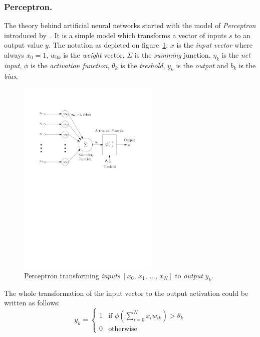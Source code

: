 \subsubsection{Perceptron.}
\label{sec:models-perceptron}

The theory behind artificial neural networks started with the model of \emph{Perceptron} introduced by~\citet{mcculloch1943logical}. It is a simple model which transforms a vector of inputs $s$ to an output value $y$. The notation as depicted on figure~\ref{fig:perceptron}: $x$ is the \emph{input vector} where always $x_0=1$, $w_{0k}$ is the \emph{weight} vector, $\Sigma$ is the \emph{summing} junction, $\eta_k$ is the \emph{net input}, $\phi$ is the \emph{activation function}, $\theta_k$ is the \emph{treshold}, $y_k$ is the \emph{output} and $b_k$ is the \emph{bias}.

\begin{figure}[H]
  \centering
  \includegraphics[width=0.6\textwidth]{img/perceptron.pdf}    
  \caption{Perceptron transforming \emph{inputs} $[x_0,\, x_1,\, \ldots,\, x_N]$ to \emph{output} $y_k$.} 
  \label{fig:perceptron}
\end{figure}

The whole transformation of the input vector to the output activation could be written as follows: 
\begin{equation}
\label{eq:perceptron} 
y_k =
\left\{
	\begin{array}{ll}
		1 & \mbox{if } \phi(\sum_{i=0}^N x_iw_{ik}) > \theta_k \\
		0 & \mbox{otherwise}
	\end{array}
\right.
\end{equation} 

